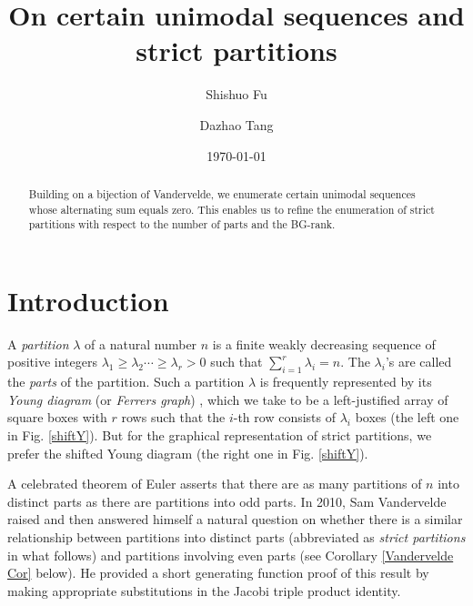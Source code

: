 \documentclass[12pt,reqno]{amsart}
\numberwithin{equation}{section}
\theoremstyle{plain}
\theoremstyle{definition}
\begin{document}
\title[Unimodal sequences and strict partitions]{On certain unimodal sequences and strict partitions}

\author[S. Fu]{Shishuo Fu}
\address[Shishuo Fu]{College of Mathematics and Statistics, Chongqing University, Huxi campus LD506, Chongqing 401331, P.R. China}


\author[D. Tang]{Dazhao Tang}

\address[Dazhao Tang]{College of Mathematics and Statistics, Chongqing University, Huxi campus LD206, Chongqing 401331, P.R. China}

\date{\today}

\begin{abstract}
Building on a bijection of Vandervelde, we enumerate certain unimodal sequences whose alternating sum equals zero. This enables us to refine the enumeration of strict partitions with respect to the number of parts and the BG-rank.
\end{abstract}



\maketitle




\section{Introduction}\label{sec1: intro}



A \emph{partition} \cite{Andr1976} $\lambda$ of a natural number $n$ is a finite weakly decreasing sequence of positive integers $\lambda_{1}\geq\lambda_{2}\cdots\geq\lambda_{r}>0$ such that $\sum_{i=1}^{r}\lambda_{i}=n$. The $\lambda_{i}$'s are called the \emph{parts} of the partition. Such a partition $\lambda$ is frequently represented by its \emph{Young diagram} (or \emph{Ferrers graph}) \cite[Chap. 1.3]{Andr1976}, which we take to be a left-justified array of square boxes with $r$ rows such that the $i$-th row consists of $\lambda_{i}$ boxes (the left one in Fig. \ref{shiftY}). But for the graphical representation of strict partitions, we prefer the shifted Young diagram (the right one in Fig. \ref{shiftY}).

A celebrated theorem of Euler asserts that there are as many partitions of $n$ into distinct parts as there are partitions into odd parts. In 2010, Sam Vandervelde \cite{Van} raised and then answered himself a natural question on whether there is a similar relationship between partitions into distinct parts (abbreviated as \emph{strict partitions} in what follows) and partitions involving even parts (see Corollary \ref{Vandervelde Cor} below). He provided a short generating function proof of this result by making appropriate substitutions in the Jacobi triple product identity.
\end{document}
